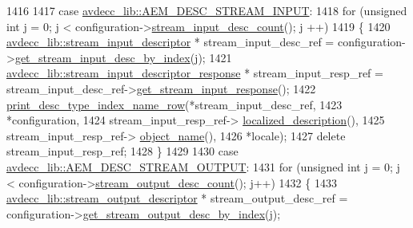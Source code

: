 \begin{DoxyCode}
1416 
1417         \textcolor{keywordflow}{case} \hyperlink{namespaceavdecc__lib_ac7b7d227e46bc72b63ee9e9aae15902fa00d002e47651a1b007d50f9f2da51e53}{avdecc\_lib::AEM\_DESC\_STREAM\_INPUT}:
1418             \textcolor{keywordflow}{for} (\textcolor{keywordtype}{unsigned} \textcolor{keywordtype}{int} j = 0; j < configuration->\hyperlink{classavdecc__lib_1_1configuration__descriptor_ab7ef88f0a1d5d8c27f0c4c6687f6a98e}{stream\_input\_desc\_count}(); j
      ++)
1419             \{
1420                 \hyperlink{classavdecc__lib_1_1stream__input__descriptor}{avdecc\_lib::stream\_input\_descriptor} * 
      stream\_input\_desc\_ref = configuration->\hyperlink{classavdecc__lib_1_1configuration__descriptor_a69cfe9032cea21937b4153878f8a925c}{get\_stream\_input\_desc\_by\_index}(j);
1421                 \hyperlink{classavdecc__lib_1_1stream__input__descriptor__response}{avdecc\_lib::stream\_input\_descriptor\_response} * 
      stream\_input\_resp\_ref = stream\_input\_desc\_ref->\hyperlink{classavdecc__lib_1_1stream__input__descriptor_a1be36084f46cee6b34b31b75e7667cc6}{get\_stream\_input\_response}();
1422                 \hyperlink{classcmd__line_ac47c21c03b69593b74e7c43201d0ba41}{print\_desc\_type\_index\_name\_row}(*stream\_input\_desc\_ref,
1423                                                *configuration,
1424                                                stream\_input\_resp\_ref->
      \hyperlink{classavdecc__lib_1_1stream__input__descriptor__response_a1fb9de45567df344090a1407aa6b775f}{localized\_description}(),
1425                                                stream\_input\_resp\_ref->
      \hyperlink{classavdecc__lib_1_1descriptor__response__base_a133f7774946d80f82b8aaaa4cfbb7361}{object\_name}(),
1426                                                *locale);
1427                 \textcolor{keyword}{delete} stream\_input\_resp\_ref;
1428             \}
1429 
1430         \textcolor{keywordflow}{case} \hyperlink{namespaceavdecc__lib_ac7b7d227e46bc72b63ee9e9aae15902fa3e5e9421e49598854000feaa2fe71464}{avdecc\_lib::AEM\_DESC\_STREAM\_OUTPUT}:
1431             \textcolor{keywordflow}{for} (\textcolor{keywordtype}{unsigned} \textcolor{keywordtype}{int} j = 0; j < configuration->\hyperlink{classavdecc__lib_1_1configuration__descriptor_a9ebee6c612e3cfec50f5168790bd265c}{stream\_output\_desc\_count}();
       j++)
1432             \{
1433                 \hyperlink{classavdecc__lib_1_1stream__output__descriptor}{avdecc\_lib::stream\_output\_descriptor} * 
      stream\_output\_desc\_ref = configuration->\hyperlink{classavdecc__lib_1_1configuration__descriptor_a300ea5957342e2e9579318135da02856}{get\_stream\_output\_desc\_by\_index}(j);

\end{DoxyCode}
